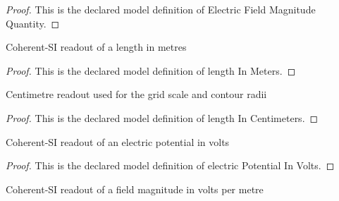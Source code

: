 \begin{proof}
  This is the declared model definition of Electric Field Magnitude Quantity.
\end{proof}
\begin{definition}
  \label{def:physics:phyx-mini-0876:phyxminiproblems-problemphyxmini0876-lengthinmeters}
  Coherent-SI readout of a length in metres
\end{definition}
\begin{proof}
  This is the declared model definition of length In Meters.
\end{proof}
\begin{definition}
  \label{def:physics:phyx-mini-0876:phyxminiproblems-problemphyxmini0876-lengthincentimeters}
  Centimetre readout used for the grid scale and contour radii
\end{definition}
\begin{proof}
  This is the declared model definition of length In Centimeters.
\end{proof}
\begin{definition}
  \label{def:physics:phyx-mini-0876:phyxminiproblems-problemphyxmini0876-electricpotentialinvolts}
  Coherent-SI readout of an electric potential in volts
\end{definition}
\begin{proof}
  This is the declared model definition of electric Potential In Volts.
\end{proof}
\begin{definition}
  \label{def:physics:phyx-mini-0876:phyxminiproblems-problemphyxmini0876-electricfieldmagnitudeinvoltspermeter}
  Coherent-SI readout of a field magnitude in volts per metre
\end{definition}
